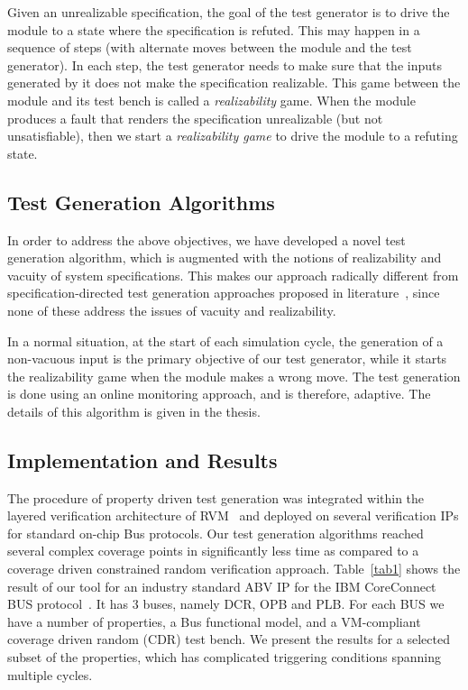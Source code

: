 \documentclass[a4paper, 11pt]{article}
\begin{document}
Given an unrealizable specification, the goal of the test generator is to
drive the module to a state where the specification is refuted. This may
happen in a sequence of steps (with alternate moves between the module and the
test generator). In each step, the test generator needs to make sure that
the inputs generated by it does not make the specification realizable. This
game between the module and its test bench is called a {\em realizability}
game. When the module produces a fault that renders the specification
unrealizable (but not unsatisfiable), then we start a {\em realizability game}
to drive the module to a refuting state.

\subsection{Test Generation Algorithms} \label{sec4.3}
In order to address the above objectives, we have developed a 
novel test generation algorithm, which is augmented with the notions 
of realizability and vacuity of system specifications. This makes 
our approach radically different from specification-directed test generation 
approaches proposed in literature~\cite{ammann, garg, SAT:01}, since none 
of these address the issues of vacuity and realizability.

In a normal situation, at the start of each simulation cycle, the generation
of a non-vacuous input is the primary objective of our test generator, while 
it starts the realizability game when the module makes a wrong move. The 
test generation is 
done using an online monitoring approach, and is therefore, adaptive.
The details of this algorithm is given in the thesis. 

\subsection{Implementation and Results} \label{sec4.4}
The procedure of property driven test generation 
was integrated within the layered verification architecture of 
RVM~\cite{rvm} and deployed on several verification
IPs for standard on-chip Bus protocols. Our test generation algorithms
reached several complex coverage points in significantly less time
as compared to a coverage driven constrained random verification
approach. Table~\ref{tab1} shows the result of our tool for an industry
standard ABV IP for the IBM CoreConnect BUS protocol~\cite{ibm}.
It has $3$ buses, namely DCR, OPB and PLB. For each BUS we have
a number of properties, a Bus functional model, and a VM-compliant~\cite{vmm}
coverage driven random (CDR) test bench. We present the
results for a selected subset of the properties, which has complicated
triggering conditions spanning multiple cycles.
\end{document}
